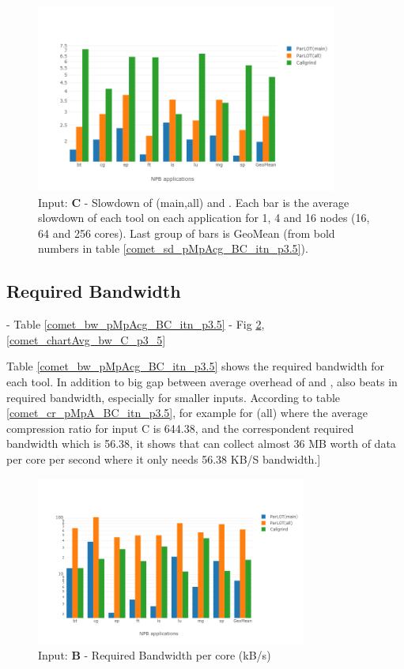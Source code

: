 \begin{figure}[!t]
\centering
\includegraphics[width=3.9in]{figs.comet/comet_chartAvg_sd_C_p3_5.png}
\caption{ Input: \textbf{C} - Slowdown of \parlot(main,all) and \callgrind. Each bar is the average slowdown of each tool on each application for 1, 4 and 16 nodes (16, 64 and 256 cores). Last group of bars is GeoMean (from bold numbers in table \ref{comet_sd_pMpAcg_BC_itn_p3.5}). 
}
\label{comet_chartAvg_sd_C_p3_5}
\end{figure}





  
\subsection{Required Bandwidth}
\label{subsec:lowbw}
 - Table \ref{comet_bw_pMpAcg_BC_itn_p3.5}
  - Fig \ref{comet_chartAvg_bw_B_p3_5}, \ref{comet_chartAvg_bw_C_p3_5}

Table \ref{comet_bw_pMpAcg_BC_itn_p3.5} shows the required bandwidth for each tool. 
In addition to big gap between average overhead of \parlotm and \callgrind, \parlotm also beats \callgrind in required bandwidth, especially for smaller inputs.
According to table \ref{comet_cr_pMpA_BC_itn_p3.5}, for example for \parlot(all) where the average compression ratio for input C is 644.38, and the correspondent required bandwidth which is 56.38, it shows that \parlot can collect almost 36 MB worth of data per core per second where it only needs 56.38 KB/S bandwidth.]





\begin{figure}[!t]
\centering
\includegraphics[width=3.5in]{figs.comet/comet_chartAvg_bw_B_p3_5.png}
\caption{ Input: \textbf{B} - Required Bandwidth per core (kB/s)
}
\label{comet_chartAvg_bw_B_p3_5}
\end{figure}



